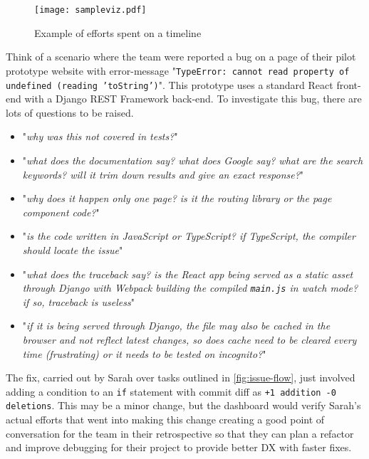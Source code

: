 \documentclass[../mpaper.tex]{subfiles}
\begin{document}
\begin{figure}
    \centering
    \texttt{[image: sampleviz.pdf]}
    \caption{Example of efforts spent on a timeline}
    \label{fig:example_timeline}
\end{figure}

Think of a scenario where the team were reported a bug on a page of their pilot prototype website with error-message "\texttt{TypeError: cannot read property of undefined (reading 'toString')}". This prototype uses a standard React front-end with a Django REST Framework back-end. To investigate this bug, there are lots of questions to be raised.

\begin{itemize}
    \itemsep-2pt
    \item "\textit{why was this not covered in tests?}"
    \item "\textit{what does the documentation say? what does Google say? what are the search keywords? will it trim down results and give an exact response?}"
    \item "\textit{why does it happen only one page? is it the routing library or the page component code?}"
    \item "\textit{is the code written in JavaScript or TypeScript? if TypeScript, the compiler should locate the issue}"
    \item "\textit{what does the traceback say? is the React app being served as a static asset through Django with Webpack building the compiled \texttt{main.js} in watch mode?\\if so, traceback is useless}"
    \item "\textit{if it is being served through Django, the file may also be cached in the browser and not reflect latest changes, so does cache need to be cleared every time (frustrating) or it needs to be tested on incognito?}"
\end{itemize}

The fix, carried out by Sarah over tasks outlined in \autoref{fig:issue-flow}, just involved adding a condition to an \texttt{if} statement with commit diff as \texttt{+1 addition -0 deletions}. This may be a minor change, but the dashboard would verify Sarah's actual efforts that went into making this change creating a good point of conversation for the team in their retrospective so that they can plan a refactor and improve debugging for their project to provide better DX with faster fixes. %
\end{document}
